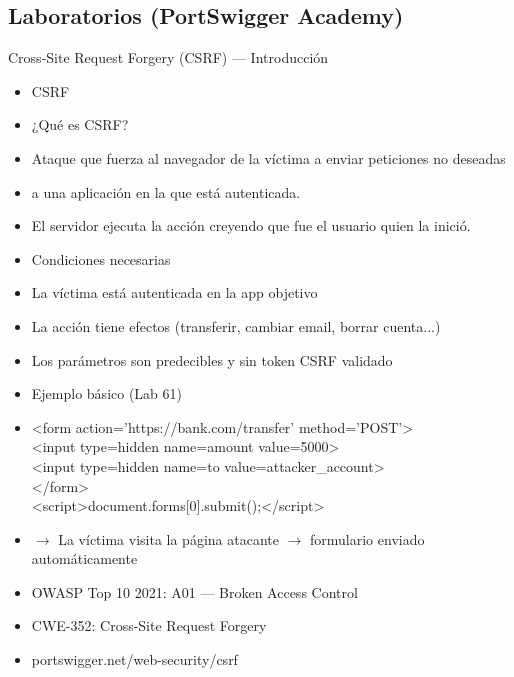 \documentclass[aspectratio=169,10pt]{beamer}
\newcommand{\cmdbox}[1]{%
  \begin{center}%
  {\setlength{\fboxsep}{6pt}\colorbox{uzlav!40}{\parbox{0.88\linewidth}{\ttfamily\footnotesize #1}}}%
  \end{center}}
\begin{document}
\subsection{Laboratorios (PortSwigger Academy)}


\begin{frame}[allowframebreaks]{Cross-Site Request Forgery (CSRF) --- Introducción}
\small
  \begin{itemize}
  \item CSRF
  \item ¿Qué es CSRF?
  \item Ataque que fuerza al navegador de la víctima a enviar peticiones no deseadas
  \item a una aplicación en la que está autenticada.
  \item El servidor ejecuta la acción creyendo que fue el usuario quien la inició.
  \item Condiciones necesarias
  \item La víctima está autenticada en la app objetivo
  \item La acción tiene efectos (transferir, cambiar email, borrar cuenta...)
  \item Los parámetros son predecibles y sin token CSRF validado
  \item Ejemplo básico (Lab 61)
  \item[] \cmdbox{\textless{}form action='https://bank.com/transfer' method='POST'\textgreater{}\\{}
\textless{}input type=hidden name=amount value=5000\textgreater{}\\{}
\textless{}input type=hidden name=to value=attacker\_account\textgreater{}\\{}
\textless{}/form\textgreater{}\\{}
\textless{}script\textgreater{}document.forms[0].submit();\textless{}/script\textgreater{}}
  \item $\rightarrow$ La víctima visita la página atacante $\rightarrow$ formulario enviado automáticamente
  \item OWASP Top 10 2021: A01 --- Broken Access Control
  \item CWE-352: Cross-Site Request Forgery
  \item portswigger.net/web-security/csrf
  \end{itemize}
\end{frame}
\end{document}
